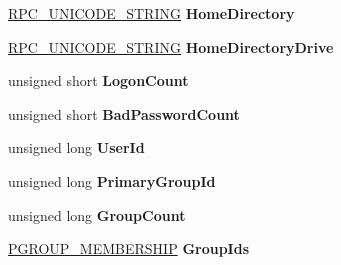 \begin{DoxyCompactItemize}
\hyperlink{struct___r_p_c___u_n_i_c_o_d_e___s_t_r_i_n_g}{R\+P\+C\+\_\+\+U\+N\+I\+C\+O\+D\+E\+\_\+\+S\+T\+R\+I\+NG} {\bfseries Home\+Directory}
\item 
\mbox{\label{struct___n_e_t_l_o_g_o_n___v_a_l_i_d_a_t_i_o_n___s_a_m___i_n_f_o4_ab86ec0f6d31b0607c0a086a2a505b0f1}} 
\hyperlink{struct___r_p_c___u_n_i_c_o_d_e___s_t_r_i_n_g}{R\+P\+C\+\_\+\+U\+N\+I\+C\+O\+D\+E\+\_\+\+S\+T\+R\+I\+NG} {\bfseries Home\+Directory\+Drive}
\item 
\mbox{\label{struct___n_e_t_l_o_g_o_n___v_a_l_i_d_a_t_i_o_n___s_a_m___i_n_f_o4_a9f03c4dca7d94b1fd9fb92eedc68feeb}} 
unsigned short {\bfseries Logon\+Count}
\item 
\mbox{\label{struct___n_e_t_l_o_g_o_n___v_a_l_i_d_a_t_i_o_n___s_a_m___i_n_f_o4_ae2917f4b7cd515c5d9b3493700e37989}} 
unsigned short {\bfseries Bad\+Password\+Count}
\item 
\mbox{\label{struct___n_e_t_l_o_g_o_n___v_a_l_i_d_a_t_i_o_n___s_a_m___i_n_f_o4_ac8d36e8128f403b2502c372c25c194bb}} 
unsigned long {\bfseries User\+Id}
\item 
\mbox{\label{struct___n_e_t_l_o_g_o_n___v_a_l_i_d_a_t_i_o_n___s_a_m___i_n_f_o4_acfda3df87ef7e95e3c939b89844d68e5}} 
unsigned long {\bfseries Primary\+Group\+Id}
\item 
\mbox{\label{struct___n_e_t_l_o_g_o_n___v_a_l_i_d_a_t_i_o_n___s_a_m___i_n_f_o4_a4781b65fd4ff60cb47ba69da3ad77d1e}} 
unsigned long {\bfseries Group\+Count}
\item 
\mbox{\label{struct___n_e_t_l_o_g_o_n___v_a_l_i_d_a_t_i_o_n___s_a_m___i_n_f_o4_a4ab6ed23415ed05ef07e50d0ec1a02aa}} 
\hyperlink{struct___g_r_o_u_p___m_e_m_b_e_r_s_h_i_p}{P\+G\+R\+O\+U\+P\+\_\+\+M\+E\+M\+B\+E\+R\+S\+H\+IP} {\bfseries Group\+Ids}
\item 

\end{DoxyCompactItemize}
